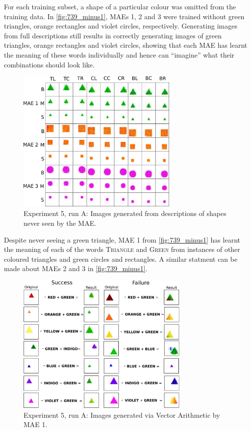 For each training subset, a shape of a particular colour was omitted from the training data. In \autoref{fig:739_minus1}, \acp{MAE} 1, 2 and 3 were trained without green triangles, orange rectangles and violet circles, respectively. Generating images from full descriptions still results in correctly generating images of green triangles, orange rectangles and violet circles, showing that each \ac{MAE} has learnt the meaning of these words individually and hence can ``imagine'' what their combinations should look like. 

\begin{figure}[h]
\centering
\includegraphics[width=0.7\textwidth]{Figs/shapes/739_minus1.png}
\caption{Experiment 5, run A: Images generated from descriptions of shapes never seen by the \ac{MAE}.}
\label{fig:739_minus1}
\end{figure}

Despite never seeing a green triangle, \ac{MAE} 1 from \autoref{fig:739_minus1} has learnt the meaning of each of the words \textsc{Triangle} and \textsc{Green} from instances of other coloured triangles and green circles and rectangles. A similar statment can be made about \acp{MAE} 2 and 3 in \autoref{fig:739_minus1}.

\begin{figure}[h]
\centering
\includegraphics[width=0.75\textwidth]{Figs/shapes/739_minus1_vectorArthGT.png}
\caption{Experiment 5, run A: Images generated via Vector Arithmetic by MAE 1.}
\label{fig:739_vectorArth}
\end{figure}

